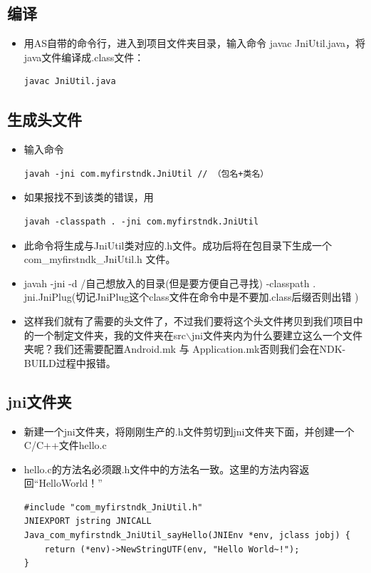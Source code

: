 \documentclass[9pt, b5paper]{article}
\begin{document}
\subsection{编译}
\label{sec-2-4}
\begin{itemize}
\item 用AS自带的命令行，进入到项目文件夹目录，输入命令 javac JniUtil.java，将java文件编译成.class文件：
\begin{verbatim}
javac JniUtil.java
\end{verbatim}
\end{itemize}

\subsection{生成头文件}
\label{sec-2-5}
\begin{itemize}
\item 输入命令
\begin{verbatim}
javah -jni com.myfirstndk.JniUtil // （包名+类名）
\end{verbatim}
\item 如果报找不到该类的错误，用
\begin{verbatim}
javah -classpath . -jni com.myfirstndk.JniUtil
\end{verbatim}
\item 此命令将生成与JniUtil类对应的.h文件。成功后将在包目录下生成一个 com\_myfirstndk\_JniUtil.h 文件。
\item javah -jni -d /自己想放入的目录(但是要方便自己寻找) -classpath . jni.JniPlug(切记JniPlug这个class文件在命令中是不要加.class后缀否则出错 )
\item 这样我们就有了需要的头文件了，不过我们要将这个头文件拷贝到我们项目中的一个制定文件夹，我的文件夹在src\main$\backslash$jni文件夹内为什么要建立这么一个文件夹呢？我们还需要配置Android.mk 与 Application.mk否则我们会在NDK-BUILD过程中报错。
\end{itemize}

\subsection{jni文件夹}
\label{sec-2-6}
\begin{itemize}
\item 新建一个jni文件夹，将刚刚生产的.h文件剪切到jni文件夹下面，并创建一个C/C++文件hello.c
\item hello.c的方法名必须跟.h文件中的方法名一致。这里的方法内容返回“HelloWorld！”
\begin{verbatim}
#include "com_myfirstndk_JniUtil.h"
JNIEXPORT jstring JNICALL Java_com_myfirstndk_JniUtil_sayHello(JNIEnv *env, jclass jobj) {
    return (*env)->NewStringUTF(env, "Hello World~!");
}
\end{verbatim}
\end{itemize}
\end{document}
